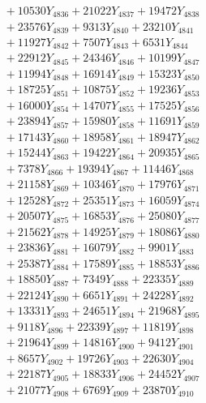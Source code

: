 \documentclass[a4paper,10pt]{article}
\begin{document}
{\begin{align}
&\;  + 10530 Y_{4836} + 21022 Y_{4837} + 19472 Y_{4838} \\[0.3ex]
&\;  + 23576 Y_{4839} + 9313 Y_{4840} + 23210 Y_{4841} \\[0.3ex]
&\;  + 11927 Y_{4842} + 7507 Y_{4843} + 6531 Y_{4844} \\[0.3ex]
&\;  + 22912 Y_{4845} + 24346 Y_{4846} + 10199 Y_{4847} \\[0.3ex]
&\;  + 11994 Y_{4848} + 16914 Y_{4849} + 15323 Y_{4850} \\[0.3ex]
&\;  + 18725 Y_{4851} + 10875 Y_{4852} + 19236 Y_{4853} \\[0.3ex]
&\;  + 16000 Y_{4854} + 14707 Y_{4855} + 17525 Y_{4856} \\[0.3ex]
&\;  + 23894 Y_{4857} + 15980 Y_{4858} + 11691 Y_{4859} \\[0.5ex]\allowbreak
&\;  + 17143 Y_{4860} + 18958 Y_{4861} + 18947 Y_{4862} \\[0.3ex]
&\;  + 15244 Y_{4863} + 19422 Y_{4864} + 20935 Y_{4865} \\[0.3ex]
&\;  + 7378 Y_{4866} + 19394 Y_{4867} + 11446 Y_{4868} \\[0.3ex]
&\;  + 21158 Y_{4869} + 10346 Y_{4870} + 17976 Y_{4871} \\[0.3ex]
&\;  + 12528 Y_{4872} + 25351 Y_{4873} + 16059 Y_{4874} \\[0.3ex]
&\;  + 20507 Y_{4875} + 16853 Y_{4876} + 25080 Y_{4877} \\[0.3ex]
&\;  + 21562 Y_{4878} + 14925 Y_{4879} + 18086 Y_{4880} \\[0.3ex]
&\;  + 23836 Y_{4881} + 16079 Y_{4882} + 9901 Y_{4883} \\[0.3ex]
&\;  + 25387 Y_{4884} + 17589 Y_{4885} + 18853 Y_{4886} \\[0.3ex]
&\;  + 18850 Y_{4887} + 7349 Y_{4888} + 22335 Y_{4889} \\[0.5ex]\allowbreak
&\;  + 22124 Y_{4890} + 6651 Y_{4891} + 24228 Y_{4892} \\[0.3ex]
&\;  + 13331 Y_{4893} + 24651 Y_{4894} + 21968 Y_{4895} \\[0.3ex]
&\;  + 9118 Y_{4896} + 22339 Y_{4897} + 11819 Y_{4898} \\[0.3ex]
&\;  + 21964 Y_{4899} + 14816 Y_{4900} + 9412 Y_{4901} \\[0.3ex]
&\;  + 8657 Y_{4902} + 19726 Y_{4903} + 22630 Y_{4904} \\[0.3ex]
&\;  + 22187 Y_{4905} + 18833 Y_{4906} + 24452 Y_{4907} \\[0.3ex]
&\;  + 21077 Y_{4908} + 6769 Y_{4909} + 23870 Y_{4910} \\[0.3ex]

\end{align}}
\end{document}
